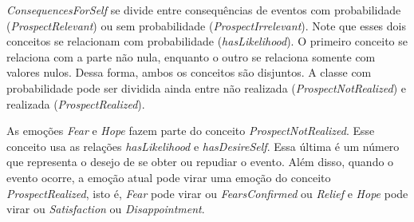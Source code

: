 \emph{ConsequencesForSelf} se divide entre consequências de eventos com
probabilidade (\emph{ProspectRelevant}) ou sem probabilidade
(\emph{ProspectIrrelevant}). Note que esses dois conceitos se
relacionam com probabilidade (\emph{hasLikelihood}). O primeiro conceito se
relaciona com a parte não nula, enquanto o outro se relaciona somente com
valores nulos. Dessa forma, ambos os conceitos são disjuntos. A classe com
probabilidade pode ser dividida ainda entre não
realizada (\emph{ProspectNotRealized}) e realizada (\emph{ProspectRealized}).

As emoções \emph{Fear} e \emph{Hope} fazem parte do conceito
\emph{ProspectNotRealized}. Esse conceito usa as relações \emph{hasLikelihood}
e \emph{hasDesireSelf}. Essa última é um número que
representa o desejo de se obter ou repudiar o evento. Além disso, quando o
evento ocorre, a emoção atual pode virar uma emoção do conceito
\emph{ProspectRealized}, isto é, \emph{Fear} pode virar ou
\emph{FearsConfirmed} ou \emph{Relief} e \emph{Hope} pode virar ou
\emph{Satisfaction} ou \emph{Disappointment}.

